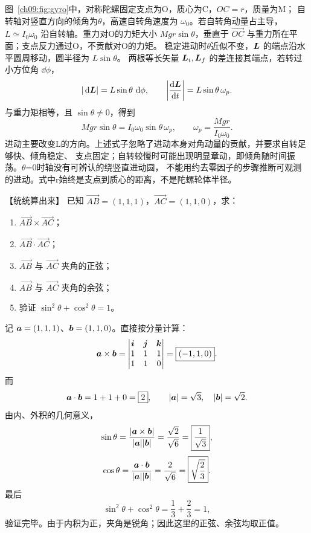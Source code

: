 {图~\ref{ch09:fig:gyro}中，对称陀螺固定支点为O，质心为C，$OC=r$，质量为M；
自转轴对竖直方向的倾角为$\theta$，高速自转角速度为 $\omega_0$。若自转角动量占主导，
$L\simeq I_0\omega_0$ 沿自转轴。重力对O的力矩大小 $Mgr\sin\theta$，垂直于
$\overrightarrow{OC}$ 与重力所在平面；支点反力通过O，不贡献对O的力矩。
\gyroDiagram
稳定进动时$\theta$近似不变，$\bm{L}$ 的端点沿水平圆周移动，圆半径为 $L\sin\theta$。
两根等长矢量 $\bm{L}_i,\bm{L}_f$ 的差连接其端点，若转过小方位角 $\dd\phi$，
\begin{equation}
 |\mathop{}\!\mathrm d\bm{L}|=L\sin\theta\,\mathop{}\!\mathrm d\phi,
 \qquad \left|\frac{\mathop{}\!\mathrm d\bm{L}}{\mathop{}\!\mathrm d t}\right|=L\sin\theta\,\omega_p.
\end{equation}
与重力矩相等，且 $\sin\theta\ne0$，得到
\begin{equation}
 Mgr\sin\theta=I_0\omega_0\sin\theta\,\omega_p,
 \qquad \boxed{\omega_p=\frac{Mgr}{I_0\omega_0}}.
\end{equation}
进动主要改变L的方向。上述式子忽略了进动本身对角动量的贡献，并要求自转足够快、倾角稳定、
支点固定；自转较慢时可能出现明显章动，即倾角随时间振荡。$\theta$=0时轴没有可辨认的绕竖直进动圆，
不能用约去零因子的步骤推断可观测的进动。式中r始终是支点到质心的距离，不是陀螺轮体半径。


\begin{origexamplebox}{【统统算出来】}\label{ch09:ex:s16-14-1}
已知 $\overrightarrow{AB}=(1,1,1)$，$\overrightarrow{AC}=(1,1,0)$，求：
\begin{enumerate}[label=(\arabic*),leftmargin=2.2em]
  \item $\overrightarrow{AB}\times\overrightarrow{AC}$；
  \item $\overrightarrow{AB}\cdot\overrightarrow{AC}$；
  \item $\overrightarrow{AB}$ 与 $\overrightarrow{AC}$ 夹角的正弦；
  \item $\overrightarrow{AB}$ 与 $\overrightarrow{AC}$ 夹角的余弦；
  \item 验证 $\sin^2\theta+\cos^2\theta=1$。
\end{enumerate}

\ThQVectors
\end{origexamplebox}

\begin{xesolution}
\ThAVectors

记 $\bm{a}=(1,1,1)$、$\bm{b}=(1,1,0)$。直接按分量计算：
\[
 \bm{a}\times\bm{b}
 =\begin{vmatrix}
   \bm{i}&\bm{j}&\bm{k}\\
   1&1&1\\
   1&1&0
  \end{vmatrix}
 =\boxed{(-1,1,0)}.
\]
而
\[
 \bm{a}\cdot\bm{b}=1+1+0=\boxed2,
 \qquad
 |\bm{a}|=\sqrt3,\quad |\bm{b}|=\sqrt2.
\]
由内、外积的几何意义，
\[
 \sin\theta=\frac{|\bm{a}\times\bm{b}|}{|\bm{a}||\bm{b}|}
 =\frac{\sqrt2}{\sqrt6}=\boxed{\frac1{\sqrt3}},
\]
\[
 \cos\theta=\frac{\bm{a}\cdot\bm{b}}{|\bm{a}||\bm{b}|}
 =\frac2{\sqrt6}=\boxed{\sqrt{\frac23}}.
\]
最后
\[
 \sin^2\theta+\cos^2\theta=\frac13+\frac23=1,
\]
验证完毕。由于内积为正，夹角是锐角；因此这里的正弦、余弦均取正值。
\end{xesolution}

}
